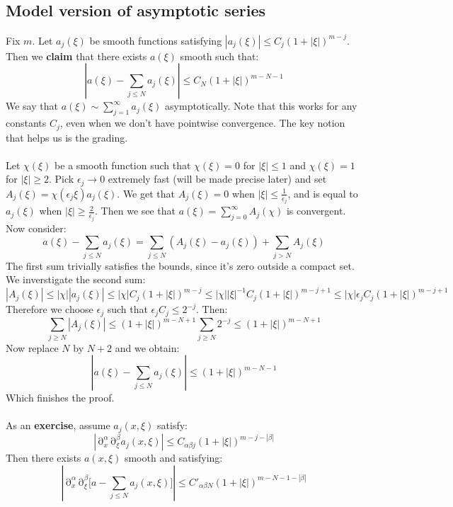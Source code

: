 \documentclass[12 pt]{article}
\DeclareMathOperator {\p} {\partial}
\theoremstyle{plain}
\theoremstyle{definition}
\theoremstyle{remark}
\begin{document}
\subsection*{Model version of asymptotic series}
Fix $m$. Let $a_j(\xi)$ be smooth functions satisfying $|a_j(\xi)|\leq C_j (1+|\xi|)^{m-j}$. Then we \textbf{claim} that there exists $a(\xi)$ smooth such that:
\[          | a(\xi) - \sum_{j\leq N} a_j(\xi) | \leq C_N (1 + |\xi|)^{m-N-1}         \]
We say that $a(\xi) \sim \sum_{j=1}^{\infty} a_j(\xi)$ asymptotically. Note that this works for any constants $C_j$, even when we don't have pointwise convergence. The key notion that helps us is the grading.
\\
\\
Let $\chi(\xi)$ be a smooth function such that $\chi(\xi) = 0$ for $|\xi|\leq 1$ and $\chi(\xi) = 1$ for $|\xi| \geq 2$. Pick $\epsilon_j \to 0$ extremely fast (will be made precise later) and set $A_j(\xi) = \chi(\epsilon_j \xi) a_j(\xi)$. We get that $A_j(\xi) = 0$ when $|\xi| \leq \frac{1}{\epsilon_j}$, and is equal to $a_j(\xi)$ when $|\xi| \geq \frac{2}{\epsilon_j}$. Then we see that $a(\xi) = \sum_{j=0}^{\infty} A_j (\chi)$ is convergent. Now consider:
\[        a(\xi) - \sum_{j\leq N} a_j(\xi) = \sum_{j\leq N} (A_j(\xi) - a_j(\xi)) + \sum_{j>N} A_j(\xi)     \]
The first sum trivially satisfies the bounds, since it's zero outside a compact set. We inverstigate the second sum:
\[       |A_j(\xi)| \leq |\chi| |a_j(\xi)| \leq |\chi| C_j (1 + |\xi|)^{m-j}  \leq |\chi| |\xi|^{-1} C_j (1+ |\xi|)^{m-j+1}  \leq |\chi| \epsilon_j C_j (1+ |\xi|)^{m-j+1}  \]
Therefore we choose $\epsilon_j$ such that $\epsilon_j C_j \leq 2^{-j}$. Then:
\[      \sum_{j\geq N}   |A_j(\xi)| \leq  (1+ |\xi|)^{m-N+1} \sum_{j\geq N} 2^{-j}  \leq  (1+ |\xi|)^{m-N+1}  \]
Now replace $N$ by $N+2$ and we obtain:
\[             | a(\xi) - \sum_{j\leq N} a_j(\xi) |  \leq   (1+ |\xi|)^{m-N-1}   \]
Which finishes the proof.
\\
\\
As an \textbf{exercise}, assume $a_j (x, \xi)$ satisfy:
\[       | \p_x^{\alpha} \p^{\beta}_{\xi} a_j(x, \xi)  |  \leq C_{\alpha \beta j} (1 + |\xi|)^{m - j - |\beta|}     \]
Then there exists $a(x, \xi)$ smooth and satisfying:
\[  \left| \p_x^{\alpha} \p_{\xi}^{\beta}    \big[  a - \sum_{j\leq N} a_j (x, \xi) \big]  \right| \leq C'_{\alpha \beta N} (1 + |\xi|)^{m - N - 1 - |\beta|}    \]
\end{document}
